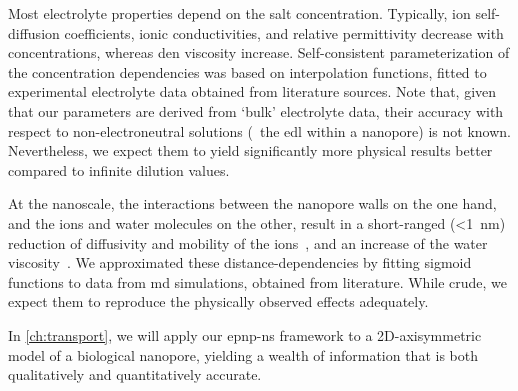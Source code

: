 Most electrolyte properties depend on the salt concentration. Typically, ion self-diffusion coefficients,
ionic conductivities, and relative permittivity decrease with concentrations, whereas den viscosity increase.
Self-consistent parameterization of the concentration dependencies was based on interpolation functions,
fitted to experimental electrolyte data obtained from literature sources. Note that, given that our parameters
are derived from `bulk' electrolyte data, their accuracy with respect to non-electroneutral solutions (\eg~the
\gls{edl} within a nanopore) is not known. Nevertheless, we expect them to yield significantly more physical
results better compared to infinite dilution values. 

At the nanoscale, the interactions between the nanopore walls on the one hand, and the ions and water
molecules on the other, result in a short-ranged (\SI{<1}{\nm}) reduction of diffusivity and mobility of the
ions~\cite{Makarov-1998}, and an increase of the water viscosity~\cite{Pronk-2014}. We approximated these
distance-dependencies by fitting sigmoid functions to data from \gls{md} simulations, obtained from
literature. While crude, we expect them to reproduce the physically observed effects adequately.

In \cref{ch:transport}, we will apply our \gls{epnp-ns} framework to a 2D-axisymmetric model of a biological
nanopore, yielding a wealth of information that is both qualitatively and quantitatively accurate. 


\cleardoublepage

